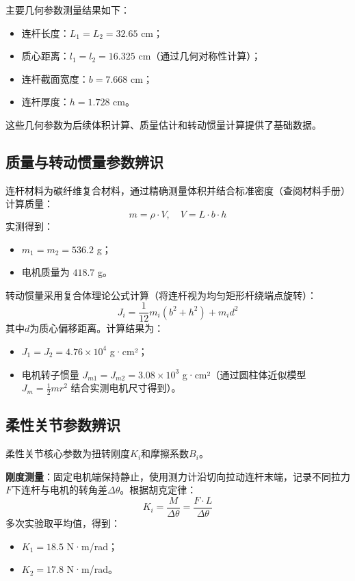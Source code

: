 \documentclass[12pt,hyperref,a4paper,UTF8]{ctexart}
\begin{document}
主要几何参数测量结果如下：
\begin{itemize}
	\item 连杆长度：$L_1 = L_2 = 32.65$ cm；
	\item 质心距离：$l_1 = l_2 = 16.325$ cm（通过几何对称性计算）；
	\item 连杆截面宽度：$b = 7.668$ cm；
	\item 连杆厚度：$h = 1.728$ cm。
\end{itemize}

这些几何参数为后续体积计算、质量估计和转动惯量计算提供了基础数据。

\subsection{质量与转动惯量参数辨识}
连杆材料为碳纤维复合材料，通过精确测量体积并结合标准密度（查阅材料手册）计算质量：
\[
m = \rho \cdot V, \quad V = L \cdot b \cdot h
\]
实测得到：
\begin{itemize}
	\item $m_1 = m_2 = 536.2$ g；
	\item 电机质量为 $418.7$ g。
\end{itemize}

转动惯量采用复合体理论公式计算（将连杆视为均匀矩形杆绕端点旋转）：
\[
J_i = \frac{1}{12} m_i (b^2 + h^2) + m_i d^2
\]
其中$d$为质心偏移距离。计算结果为：
\begin{itemize}
	\item $J_1 = J_2 = 4.76 \times 10^4$ g·cm²；
	\item 电机转子惯量 $J_{m1} = J_{m2} = 3.08 \times 10^3$ g·cm²（通过圆柱体近似模型 $J_m = \frac{1}{2} m r^2$ 结合实测电机尺寸得到）。
\end{itemize}

\subsection{柔性关节参数辨识}
柔性关节核心参数为扭转刚度$K_i$和摩擦系数$B_i$。

\textbf{刚度测量}：固定电机端保持静止，使用测力计沿切向拉动连杆末端，记录不同拉力$F$下连杆与电机的转角差$\Delta\theta$。根据胡克定律：
\[
K_i = \frac{M}{\Delta\theta} = \frac{F \cdot L}{\Delta\theta}
\]
多次实验取平均值，得到：
\begin{itemize}
	\item $K_1 = 18.5$ N·m/rad；
	\item $K_2 = 17.8$ N·m/rad。
\end{itemize}
\end{document}

